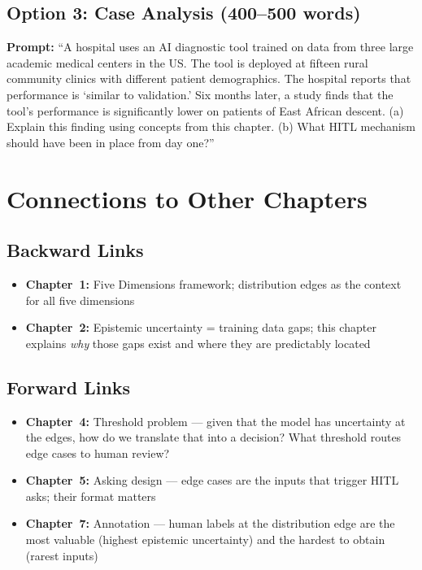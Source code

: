 \subsection{Option 3: Case Analysis (400--500 words)}

\textbf{Prompt:} ``A hospital uses an AI diagnostic tool trained on data from three large academic medical centers in the US. The tool is deployed at fifteen rural community clinics with different patient demographics. The hospital reports that performance is `similar to validation.' Six months later, a study finds that the tool's performance is significantly lower on patients of East African descent. (a) Explain this finding using concepts from this chapter. (b) What HITL mechanism should have been in place from day one?''

\section{Connections to Other Chapters}

\subsection{Backward Links}
\begin{itemize}
    \item \textbf{Chapter~1:} Five Dimensions framework; distribution edges as the context for all five dimensions
    \item \textbf{Chapter~2:} Epistemic uncertainty = training data gaps; this chapter explains \emph{why} those gaps exist and where they are predictably located
\end{itemize}

\subsection{Forward Links}
\begin{itemize}
    \item \textbf{Chapter~4:} Threshold problem --- given that the model has uncertainty at the edges, how do we translate that into a decision? What threshold routes edge cases to human review?
    \item \textbf{Chapter~5:} Asking design --- edge cases are the inputs that trigger HITL asks; their format matters
    \item \textbf{Chapter~7:} Annotation --- human labels at the distribution edge are the most valuable (highest epistemic uncertainty) and the hardest to obtain (rarest inputs)
\end{itemize}

